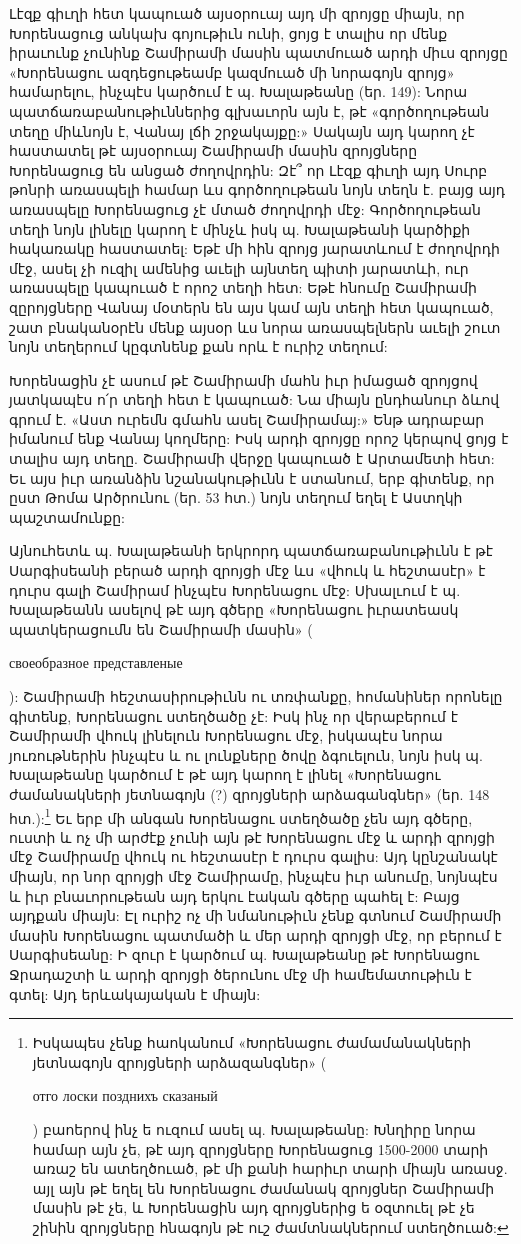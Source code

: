 \documentclass{article}
\begin{document}
{Լէզք գիւղի հետ կապուած այսօրուայ այդ մի զրոյցը միայն, որ Խորենացուց անկախ գոյութիւն ունի, ցոյց է տալիս որ մենք իրաւունք չունինք Շամիրամի մասին պատմուած արդի միւս զրոյցը «Խորենացու ազդեցութեամբ կազմուած մի նորագոյն զրոյց» համարելու, ինչպէս կարծում է պ. Խալաթեանը (եր. 149): Նորա պատճառաբանութիւններից գլխաւորն այն է, թէ «գործողութեան տեղը միևնոյն է, Վանայ լճի շրջակայքը:» Սակայն այդ կարող չէ հաստատել թէ այսօրուայ Շամիրամի մասին զրոյցները Խորենացուց են անցած ժողովրդին: Զէ՞ որ Լէզք գիւղի այդ Սուրբ թոնրի առասպելի համար ևս գործողութեան նոյն տեղն է. բայց այդ առասպելը Խորենացուց չէ մտած ժողովրդի մէջ: Գործողութեան տեղի նոյն լինելը կարող է մինչև իսկ պ. Խալաթեանի կարծիքի հակառակը հաստատել: Եթէ մի հին զրոյց յարատևում է ժողովրդի մէջ, ասել չի ուզիլ ամենից աւելի այնտեղ պիտի յարատևի, ուր առասպելը կապուած է որոշ տեղի հետ: Եթէ հնումը Շամիրամի զըրոյցները Վանայ մօտերն են այս կամ այն տեղի հետ կապուած, շատ բնականօրէն մենք այսօր ևս նորա առասպելներն աւելի շուտ նոյն տեղերում կըգտնենք քան որև է ուրիշ տեղում:

Խորենացին չէ ասում թէ Շամիրամի մահն իւր իմացած զրոյցով յատկապէս ո՛ր տեղի հետ է կապուած: Նա միայն ընդհանուր ձևով գրում է. «Աստ ուրեմն գմահն ասել Շամիրամայ:» Ենթ ադրաբար իմանում ենք Վանայ կողմերը: Իսկ արդի զրոյցը որոշ կերպով ցոյց է տալիս այդ տեղը. Շամիրամի վերջը կապուած է Արտամետի հետ: Եւ այս իւր առանձին նշանակութիւնն է ստանում, երբ գիտենք, որ ըստ Թոմա Արծրունու (եր. 53 հտ.) նոյն տեղում եղել է Աստղկի պաշտամունքը:

Այնուհետև պ. Խալաթեանի երկրորդ պատճառաբանութիւնն է թէ Սարգիսեանի բերած արդի զրոյցի մէջ ևս «վհուկ և հեշտասէր» է դուրս գալի Շամիրամ ինչպէս Խորենացու մէջ: Սխալւում է պ. Խալաթեանն ասելով թէ այդ գծերը «Խորենացու իւրատեասկ պատկերացումն են Շամիրամի մասին» (\begin{russian}своеобразное представленые\end{russian}): Շամիրամի հեշտասիրութիւնն ու տռփանքը, հոմանիներ որոնելը գիտենք, Խորենացու ստեղծածը չէ: Իսկ ինչ որ վերաբերում է Շամիրամի վհուկ լինելուն Խորենացու մէջ, իսկապէս նորա յուռութներին ինչպէս և ու լունքները ծովը ձգուելուն, նոյն իսկ պ. Խալաթեանը կարծում է թէ այդ կարող է լինել «Խորենացու ժամանակների յետնագոյն (?) զրոյցների արձագանգներ» (եր. 148 հտ.):\footnote{Իսկապես չենք հաոկանում «Խորենացու ժամամանակների յետնագոյն զրոյցների արձազանգներ» (\begin{russian}отго лоски позднихъ сказаный\end{russian}) բաոերով ինչ ե ուզում ասել պ. Խալաթեանը: Խնղիրը նորա համար այն չե, թէ այդ զրոյցները Խորենացուց 1500-2000 տարի առաշ են ատեղծուած, թէ մի քանի հարիւր տարի միայն առասջ. այլ այն թէ եղել են Խորենացու ժամանակ զրոյցներ Շամիրամի մասին թէ չե, և Խորենացին այդ զրոյցներից ե օզտուել թէ չե շինին զրոյցները հնագոյն թէ ուշ ժամտնակներում ստեղծուած:} Եւ երբ մի անգան Խորենացու ստեղծածը չեն այդ գծերը, ուստի և ոչ մի արժէք չունի այն թէ Խորենացու մէջ և արդի զրոյցի մէջ Շամիրամը վհուկ ու հեշտասէր է դուրս գալիս: Այդ կընշանակէ միայն, որ նոր զրոյցի մէջ Շամիրամը, ինչպէս իւր անումը, նոյնպէս և իւր բնաւորութեան այդ երկու էական գծերը պահել է: Բայց այդքան միայն: Էլ ուրիշ ոչ մի նմանութիւն չենք գտնում Շամիրամի մասին Խորենացու պատմածի և մեր արդի զրոյցի մէջ, որ բերում է Սարգիսեանը: Ի զուր է կարծում պ. Խալաթեանը թէ Խորենացու Ջրադաշտի և արդի զրոյցի ծերունու մէջ մի համեմատութիւն է գտել: Այդ երևակայական է միայն:

}
\end{document}

